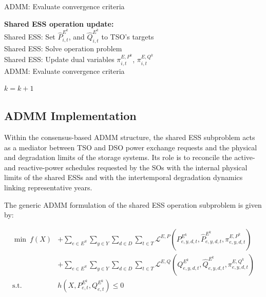 \documentclass[preprint,12pt]{elsarticle}
\begin{document}
\begin{algorithm}[htbp!]
{        %
        ADMM: Evaluate convergence criteria\\

        \textbf{Shared ESS operation update:}\\
        Shared ESS: Set 
        $\hat{P}^{E^k}_{i,t}$, and 
        $\hat{Q}^{E^k}_{i,t}$
        to TSO's targets\\
        Shared ESS: Solve operation problem\\
        Shared ESS: Update dual variables 
        $\pi^{E,P^k}_{i,t}$, 
        $\pi^{E,Q^k}_{i,t}$\\

        ADMM: Evaluate convergence criteria\\
        
        $k = k + 1$
    }  
    \caption{Updated TSO--DSO coordinated operational planning. Integration of the shared ESS degradation subproblem.}
    \label{alg:operational_planning_degradation}
\end{algorithm}

\subsection{ADMM Implementation}
\label{app:admm_updated_implementation}

Within the consensus-based ADMM structure, the shared ESS subproblem acts as a mediator between TSO and DSO power exchange requests and the physical and degradation limits of the storage systems. 
Its role is to reconcile the active- and reactive-power schedules requested by the SOs with the internal physical limits of the shared ESSs and with the intertemporal degradation dynamics linking representative years.

The generic ADMM formulation of the shared ESS operation subproblem is given by:

\begin{subequations}
    \label{model:admm_sess}
    \begin{align}
    \min~f\left(X\right)
    & + \sum_{e \in E^S} \sum_{y \in Y} \sum_{d \in D} \sum_{t \in T} \mathcal{L}^{E,P} \left(P^{E^k}_{e, y, d, t}, \hat{P}^{E^k}_{e, y, d, t}, \pi^{{E,P}^k}_{e, y, d, t} \right) \\
    & + \sum_{e \in E^S} \sum_{y \in Y} \sum_{d \in D} \sum_{t \in T} \mathcal{L}^{E,Q} \left(Q^{E^k}_{e, y, d, t}, \hat{Q}^{E^k}_{e, y, d, t}, \pi^{{E,Q}^k}_{e, y, d, t} \right) \nonumber\\
    \text{s.t.} \quad & h \left(X, P^{E^k}_{e,t}, Q^{E^k}_{e,t} \right) \leq 0
    \label{eq:admm_sess_cons}
    \end{align}
\end{subequations}
\end{document}
